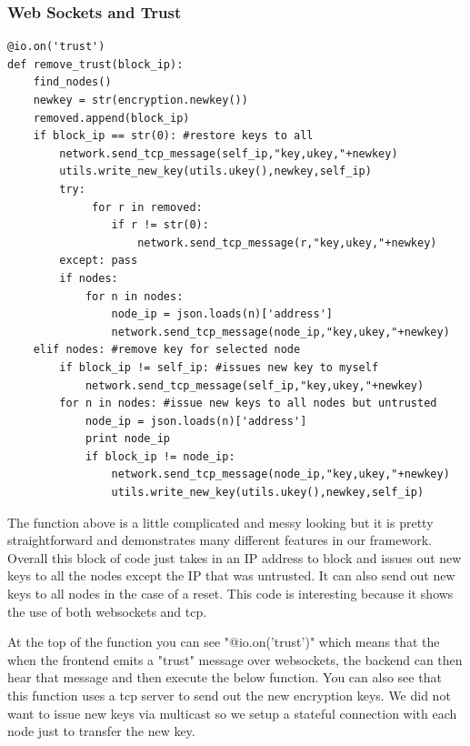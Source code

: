 \documentclass[draftclsnofoot, onecolumn, compsoc, 10pt]{IEEEtran}
\begin{document}
\subsubsection{Web Sockets and Trust}
\begin{lstlisting}
@io.on('trust')
def remove_trust(block_ip):
	find_nodes()
	newkey = str(encryption.newkey())
	removed.append(block_ip)
	if block_ip == str(0): #restore keys to all
		network.send_tcp_message(self_ip,"key,ukey,"+newkey)
		utils.write_new_key(utils.ukey(),newkey,self_ip)
		try:
			 for r in removed:
			 	if r != str(0):
			 		network.send_tcp_message(r,"key,ukey,"+newkey)
		except: pass
		if nodes:
			for n in nodes:
				node_ip = json.loads(n)['address']
				network.send_tcp_message(node_ip,"key,ukey,"+newkey)
	elif nodes: #remove key for selected node
		if block_ip != self_ip: #issues new key to myself
			network.send_tcp_message(self_ip,"key,ukey,"+newkey)
		for n in nodes: #issue new keys to all nodes but untrusted
			node_ip = json.loads(n)['address']
			print node_ip
			if block_ip != node_ip:
				network.send_tcp_message(node_ip,"key,ukey,"+newkey)
				utils.write_new_key(utils.ukey(),newkey,self_ip)

\end{lstlisting}
The function above is a little complicated and messy looking but it is pretty straightforward and demonstrates many different features in our framework. Overall this block of code just takes in an IP address to block and issues out new keys to all the nodes except the IP that was untrusted. It can also send out new keys to all nodes in the case of a reset. This code is interesting because it shows the use of both websockets and tcp. 

At the top of the function you can see "@io.on('trust')" which means that the when the frontend emits a "trust" message over websockets, the backend can then hear that message and then execute the below function. You can also see that this function uses a tcp server to send out the new encryption keys. We did not want to issue new keys via multicast so we setup a stateful connection with each node just to transfer the new key. 


\end{document}

